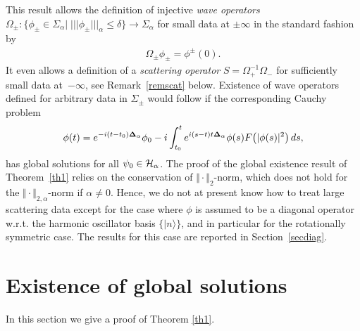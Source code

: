 \documentclass[pdftex]{sigma}
\begin{document}
This result allows the def\/inition of injective {\it wave operators}
$\Omega_{\pm}: \{\phi_\pm\in\Sigma_{\alpha}|\;
|||\phi_\pm|||_\alpha\leq\delta\} \to\Sigma_{\alpha}$ for small data
at $\pm\infty$ in the standard fashion by
\begin{gather}\label{waveop}
\Omega_{\pm}\phi_\pm = \phi^\pm(0) .
\end{gather}
It even allows a def\/inition of a {\it scattering operator}
$S=\Omega_+^{-1}\Omega_-$ for suf\/f\/iciently small data at~$-\infty$,
see Remark~\ref{remscat} below. Existence of wave operators def\/ined
for arbitrary data in
$\Sigma_\pm$ would follow if the corresponding Cauchy problem
\begin{gather*}
\phi(t) = e^{-i(t-t_0){\bf\Delta}_\alpha}\phi_0 - i\int_{t_0}^t
e^{i(s-t)t{\bf\Delta}_\alpha}\phi(s) F\big(|\phi(s)|^2\big)\,ds ,
\end{gather*}
 has global solutions for all $\psi_0\in{\cal H}_\alpha$. The proof of
the global existence result of Theorem~\ref{th1} relies on the
conservation of $\Vert\cdot\Vert_2$-norm, which does not hold for the
$\Vert\cdot\Vert_{2,\alpha}$-norm if $\alpha\neq 0$. Hence, we do not at
present know how to treat large scattering data except for the case where
 $\phi$ is assumed to be a diagonal operator w.r.t. the harmonic
oscillator basis $\{|n\rangle\}$, and in particular for the
rotationally symmetric case. The results for this case are reported in
 Section~\ref{secdiag}.


\section{Existence of global solutions}
\label{secth1}

In this section we give a proof of Theorem \ref{th1}.
\end{document}
